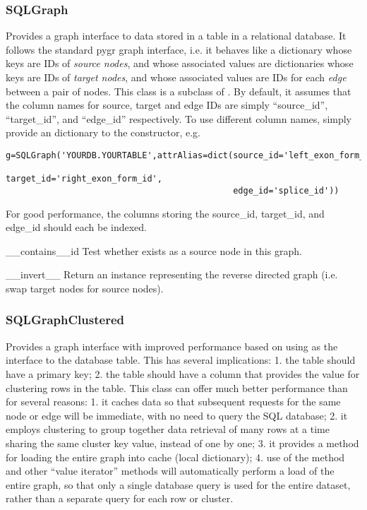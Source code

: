 \documentclass{howto}
\begin{document}
\subsubsection{SQLGraph}
Provides a graph interface to data stored in a table
in a relational database.  It follows the standard pygr 
graph interface, i.e. it behaves like a dictionary whose
keys are IDs of {\em source nodes}, and whose associated
values are dictionaries whose keys are IDs of {\em target nodes},
and whose associated values are IDs for each {\em edge} between
a pair of nodes.  This class is a subclass of 
.  By default, it assumes that
the column names for source, target and edge IDs are simply
``source_id'', ``target_id'', and ``edge_id'' respectively.
To use different column names, simply provide an 
dictionary to the constructor, e.g.
\begin{verbatim}
g=SQLGraph('YOURDB.YOURTABLE',attrAlias=dict(source_id='left_exon_form_id',
                                             target_id='right_exon_form_id',
                                             edge_id='splice_id'))
\end{verbatim}
For good performance, the columns storing the source_id, target_id,
and edge_id should each be indexed.

\begin{funcdesc}{__contains__}{id}
  Test whether  exists as a source node in this graph.
\end{funcdesc}

\begin{funcdesc}{__invert__}{}
  Return an  instance representing the reverse 
  directed graph (i.e. swap target nodes for source nodes).
\end{funcdesc}

\subsubsection{SQLGraphClustered}
Provides a graph interface with improved performance based on
using  as the interface to the database
table.  This has several implications: 1. the table should have
a primary key; 2. the table should have a 
column that provides the value for clustering rows in the table.
This class can offer much better performance than 
for several reasons: 1. it caches data so that subsequent requests
for the same node or edge will be immediate, with no need to query
the SQL database; 2. it employs clustering to group together 
data retrieval of many rows at a time sharing the same cluster key
value, instead of one by one; 3. it provides a 
method for loading the entire graph into cache (local dictionary);
4. use of the  method and other ``value iterator'' methods
will automatically perform a load of the entire graph, so that 
only a single database query is used for the entire dataset, 
rather than a separate query for each row or cluster.
\end{document}
